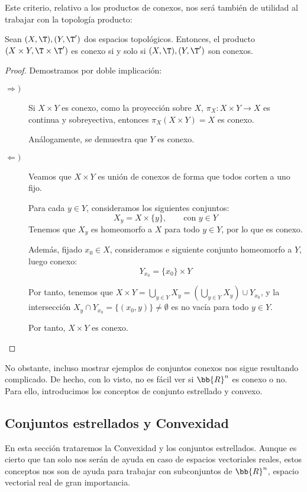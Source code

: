 Este criterio, relativo a los productos de conexos, nos será también de utilidad al trabajar con la topología producto:
\begin{prop}
    Sean $(X,\T), (Y,\T')$ dos espacios topológicos. Entonces, el producto $(X\times Y, \T\times \T')$ es conexo si y solo si $(X,\T), (Y,\T')$ son conexos.
\end{prop}
\begin{proof}
    Demostramos por doble implicación:
    \begin{description}
        \item[$\Longrightarrow)$]
        Si $X\times Y$ es conexo, como la proyección sobre $X$, $\pi_X:X\times Y\to X$ es continua y sobreyectiva, entonces $\pi_X(X\times Y)=X$ es conexo.

        Análogamente, se demuestra que $Y$ es conexo.

        \item[$\Longleftarrow)$] Veamos que $X\times Y$ es unión de conexos de forma que todos corten a uno fijo.

        Para cada $y\in Y$, consideramos los siguientes conjuntos:
        \begin{equation*}
            X_y = X\times \{y\},\qquad \text{con } y\in Y
        \end{equation*}
        Tenemos que $X_y$ es homeomorfo a $X$ para todo $y\in Y$, por lo que es conexo.

        Además, fijado $x_0\in X$, consideramos e siguiente conjunto homeomorfo a $Y$, luego conexo:
        \begin{equation*}
            Y_{x_0} = \{x_0\}\times Y
        \end{equation*}

        Por tanto, tenemos que $X\times Y = \bigcup\limits_{y\in Y}X_y = \left(\bigcup\limits_{y\in Y}X_y\right) \cup Y_{x_0}$, y la intersección $X_y\cap Y_{x_0}=\{(x_0,y)\}\neq \emptyset$ es no vacía para todo $y\in Y$.

        Por tanto, $X\times Y$ es conexo.
    \end{description}
\end{proof}

No obstante, incluso mostrar ejemplos de conjuntos conexos nos sigue resultando complicado. De hecho, con lo visto, no es fácil ver si $\bb{R}^n$ es conexo o no.
Para ello, introducimos los conceptos de conjunto estrellado y convexo.
\subsection{Conjuntos estrellados y Convexidad}
En esta sección trataremos la Convexidad y los conjuntos estrellados. Aunque es cierto que tan solo nos serán de ayuda en caso de
espacios vectoriales reales, estos conceptos nos son de ayuda para trabajar con subconjuntos de $\bb{R}^n$, espacio vectorial real de gran importancia.

